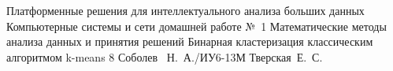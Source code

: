\makereporttitle
{Платформенные решения для интеллектуального анализа больших данных}
{Компьютерные системы и сети}
{домашней работе №~1}
{Математические методы анализа данных и принятия решений}
{Бинарная кластеризация классическим алгоритмом k-means}
{8}
{Соболев ~Н.~А./ИУ6-13М}
{Тверская~Е.~С.}
